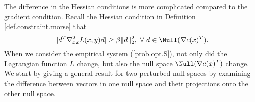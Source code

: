 The difference in the Hessian conditions is more complicated compared to the gradient condition. Recall the Hessian condition in Definition \ref{def.constraint.morse} that
\[
|d^T\nabla^2_{xx}L(x,y)d|\ge\beta\|d\|_2^2,\ \forall\ d\in\Null(\nabla c(x)^T).
\]
When we consider the empirical system (\ref{prob.opt.S}), not only did the Lagrangian function $L$ change, but also the null space $\Null(\nabla c(x)^T)$ change. We start by giving a general result for two perturbed null spaces by examining the difference between vectors in one null space and their projections onto the other null space.

%


